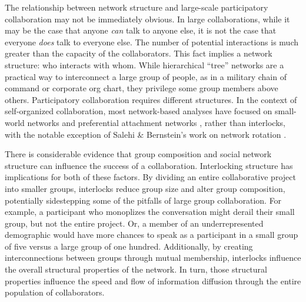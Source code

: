 \documentclass[manuscript,screen,review,acmsmall]{acmart}
\begin{document}
The relationship between network structure and large-scale participatory collaboration may not be immediately obvious.
In large collaborations, while it may be the case that anyone {\em can} talk to anyone else, it is not the case that everyone {\em does} talk to everyone else.
The number of potential interactions is much greater than the capacity of the collaborators.
This fact implies a network structure: who interacts with whom.
While hierarchical ``tree'' networks are a practical way to interconnect a large group of people,
as in a military chain of command or corporate org chart,
they privilege some group members above others.
Participatory collaboration requires different structures.
In the context of self-organized collaboration, most network-based analyses have focused on 
small-world networks \cite{watts_collective_1998}
and preferential attachment networks \cite{barabasi_emergence_1999},
rather than interlocks,
with the notable exception of Salehi \& Bernstein's work on network rotation \cite{salehi_hive:_2018}.

There is considerable evidence that group composition
\cite{hill_group_1982,
nishi_inequality_2015,
robert_jr_differences_2018,
sydow_diversity_2017,
lerner_diverse_2018,
arazy_information_2011}
and social network structure
\cite{
kearns_experiments_2012,
barkoczi_social_2016,
salehi_hive:_2018,
mason_propagation_2008,
mason_collaborative_2012}
can influence the success of a collaboration.
Interlocking structure has implications for both of these factors.
By dividing an entire collaborative project into smaller groups,
interlocks reduce group size and alter group composition,
potentially sidestepping some of the pitfalls of large group collaboration.
For example, a participant who monoplizes the conversation might derail their small group, but not the entire project.
Or, a member of an underrepresented demographic would have more chances to speak as a participant in a small group of five versus a large group of one hundred.
Additionally, by creating interconnections between groups through mutual membership,
interlocks influence the overall structural properties of the network.
In turn, those structural properties influence the speed and flow of information diffusion through the entire population of collaborators.
\end{document}

